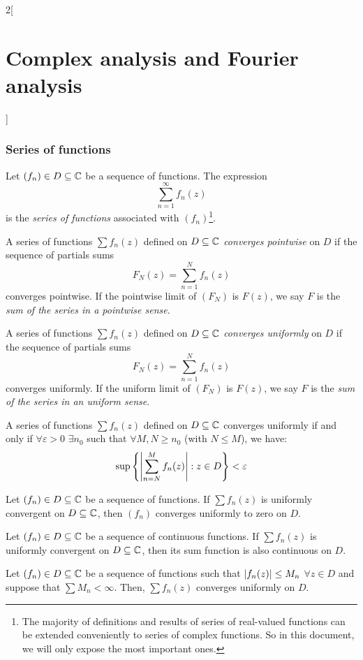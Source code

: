 \documentclass[../../../main.tex]{subfiles}
\begin{document}
\begin{multicols}{2}[\section{Complex analysis and Fourier analysis}]
  \subsubsection{Series of functions}
  \begin{definition}
    Let $(f_n)\in D\subseteq\mathbb{C}$ be a sequence of functions. The expression $$\sum_{n=1}^\infty f_n(z)$$ is the \emph{series of functions} associated with $(f_n)$\footnote{The majority of definitions and results of series of real-valued functions can be extended conveniently to series of complex functions. So in this document, we will only expose the most important ones.}.
  \end{definition}
  \begin{definition}
    A series of functions $\sum f_n(z)$ defined on $D\subseteq\mathbb{C}$ \emph{converges pointwise} on $D$ if the sequence of partials sums $$F_N(z)=\sum_{n=1}^Nf_n(z)$$ converges pointwise. If the pointwise limit of $(F_N)$ is $F(z)$, we say $F$ is the \emph{sum of the series in a pointwise sense}.
  \end{definition}
  \begin{definition}
    A series of functions $\sum f_n(z)$ defined on $D\subseteq\mathbb{C}$ \emph{converges uniformly} on $D$ if the sequence of partials sums $$F_N(z)=\sum_{n=1}^Nf_n(z)$$ converges uniformly. If the uniform limit of $(F_N)$ is $F(z)$, we say $F$ is the \emph{sum of the series in an uniform sense}.
  \end{definition}
  \begin{theorem}
    A series of functions $\sum f_n(z)$ defined on $D\subseteq\mathbb{C}$ converges uniformly if and only if $\forall\varepsilon>0$ $\exists n_0$ such that $\forall  M, N\geq n_0$ (with $N\leq M$), we have: $$\sup\left\{\abs{\sum_{n=N}^Mf_n(z)}:z\in D\right\}< \varepsilon$$
  \end{theorem}
  \begin{corollary}
    Let $(f_n)\in D\subseteq\mathbb{C}$ be a sequence of functions. If $\sum f_n(z)$ is uniformly convergent on $D\subseteq\mathbb{C}$, then $(f_n)$ converges uniformly to zero on $D$.
  \end{corollary}
  \begin{theorem}
    Let $(f_n)\in D\subseteq\mathbb{C}$ be a sequence of continuous functions. If $\sum f_n(z)$ is uniformly convergent on $D\subseteq\mathbb{C}$, then its sum function is also continuous on $D$.
  \end{theorem}
  \begin{theorem}
    Let $(f_n)\in D\subseteq\mathbb{C}$ be a sequence of functions such that $\abs{f_n(z)}\leq M_n$ $\forall z\in D$ and suppose that $\sum M_n<\infty$. Then, $\sum f_n(z)$ converges uniformly on $D$.

\end{theorem}
\end{multicols}
\end{document}
